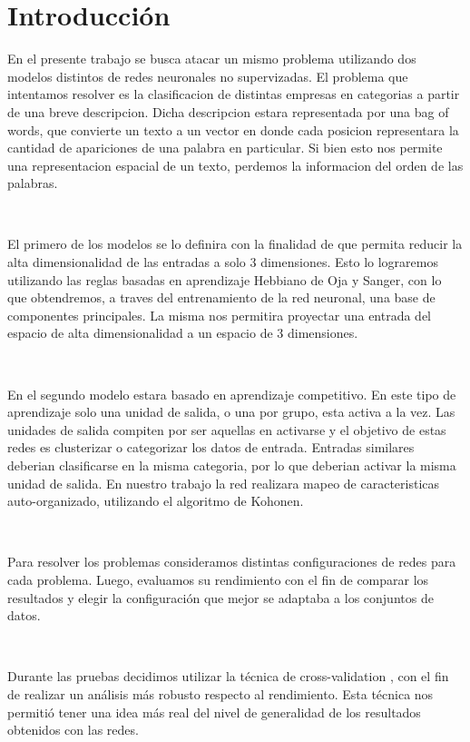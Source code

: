\documentclass[informe.tex]{subfiles}
\begin{document}
  
  \section{Introducción}
  
  En el presente trabajo se busca atacar un mismo problema utilizando dos modelos distintos de redes neuronales no supervizadas. El problema que intentamos resolver es la clasificacion de distintas empresas en categorias a partir de una breve descripcion. Dicha descripcion estara representada por una bag of words, que convierte un texto a un vector en donde cada posicion representara la cantidad de apariciones de una palabra en particular. Si bien esto nos permite una representacion espacial de un texto, perdemos la informacion del orden de las palabras.
  
  ~

  El primero de los modelos se lo definira con la finalidad de que permita reducir la alta dimensionalidad de las entradas a solo 3 dimensiones. Esto lo lograremos utilizando las reglas basadas en aprendizaje Hebbiano de Oja y Sanger\cite{haykin}, con lo que obtendremos, a traves del entrenamiento de la red neuronal, una base de componentes principales. La misma nos permitira proyectar una entrada del espacio de alta dimensionalidad a un espacio de 3 dimensiones.
  
  ~
  
  En el segundo modelo estara basado en aprendizaje competitivo\cite{haykin}. En este tipo de aprendizaje solo una unidad de salida, o una por grupo, esta activa a la vez. Las unidades de salida compiten por ser aquellas en activarse y el objetivo de estas redes es clusterizar o categorizar los datos de entrada. Entradas similares deberian clasificarse en la misma categoria, por lo que deberian activar la misma unidad de salida. En nuestro trabajo la red realizara mapeo de caracteristicas auto-organizado, utilizando el algoritmo de Kohonen.
  
  ~
  
  Para resolver los problemas consideramos distintas configuraciones de redes para cada problema. Luego, evaluamos su rendimiento con el fin de comparar los resultados y elegir la configuración que mejor se adaptaba a los conjuntos de datos.
  
  ~
  
  Durante las pruebas decidimos utilizar la técnica de cross-validation \cite{haykin}, con el fin de realizar un análisis más robusto respecto al rendimiento. Esta técnica nos permitió tener una idea más real del nivel de generalidad de los resultados obtenidos con las redes.
  
  
\end{document}
